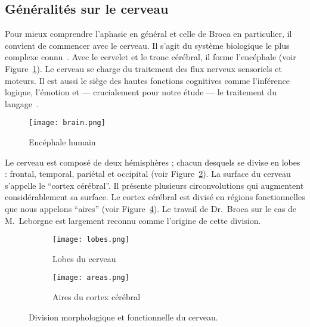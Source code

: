 \subsection{Généralités sur le cerveau}

Pour mieux comprendre l'aphasie en général et celle de Broca en particulier, 
il convient de commencer avec le cerveau.
Il s'agit du système biologique le plus complexe connu~\cite{}.
Avec le cervelet et le tronc cérébral, il forme l'encéphale (voir Figure~\ref{fig:brain}).
Le cerveau se charge du traitement des flux nerveux sensoriels et moteurs.
Il est aussi le siège des hautes fonctions cognitives comme l'inférence logique, l'émotion 
et --- crucialement pour notre étude --- le traitement du langage~\cite{}.

\begin{figure}[htb]
    \begin{center}
        \texttt{[image: brain.png]}
    \end{center}
    \caption{Encéphale humain}
    \label{fig:brain}
\end{figure}

Le cerveau est composé de deux hémisphères ; chacun desquels se divise en lobes : 
frontal, temporal, pariétal et occipital (voir Figure~\ref{fig:lobes}).
La surface du cerveau s'appelle le ``cortex cérébral''.
Il présente plusieurs circonvolutions qui augmentent considérablement sa surface.
Le cortex cérébral est divisé en régions fonctionnelles que nous appelons ``aires''
(voir Figure~\ref{fig:brain-areas}).
Le travail de Dr.~Broca sur le cas de M.~Leborgne est largement reconnu comme l'origine de cette division.


\begin{figure}[htb]
    \begin{center}

        \begin{subfigure}{.38\linewidth}
            \texttt{[image: lobes.png]}
            \caption{Lobes du cerveau~\cite{}}
            \label{fig:lobes}
        \end{subfigure}
        \begin{subfigure}{.52\linewidth}
            \texttt{[image: areas.png]}
            \caption{Aires du cortex cérébral~\cite{}}
            \label{fig:brain-areas}
        \end{subfigure}
        
        
    \end{center}
    \caption{Division morphologique et fonctionnelle du cerveau.}
\end{figure}


